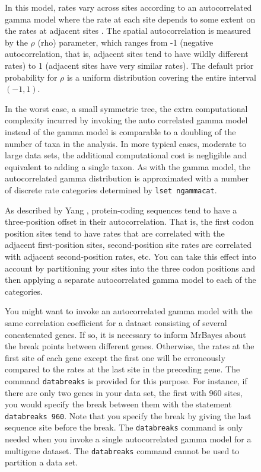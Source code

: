 \documentclass[12pt]{book}
\newcommand{\ttt}[1]{\texttt{#1}}
\begin{document}
\begin{figure}[h]
In this model, rates vary across sites according to an autocorrelated gamma model where the rate at
each site depends to some extent on the rates at adjacent sites \citep{yang95a}. The spatial
autocorrelation is measured by the $\rho$ (rho) parameter, which ranges from -1 (negative
autocorrelation, that is, adjacent sites tend to have wildly different rates) to 1 (adjacent sites
have very similar rates). The default prior probability for $\rho$ is a uniform distribution
covering the entire interval $(-1,1)$.

In the worst case, a small symmetric tree, the extra computational complexity incurred by invoking
the auto correlated gamma model instead of the gamma model is comparable to a doubling of the
number of taxa in the analysis. In more typical cases, moderate to large data sets, the additional
computational cost is negligible and equivalent to adding a single taxon. As with the gamma model,
the autocorrelated gamma distribution is approximated with a number of discrete rate categories
determined by \ttt{lset ngammacat}.

As described by Yang \citep{yang95a}, protein-coding sequences tend to have a three-position offset
in their autocorrelation. That is, the first codon position sites tend to have rates that are
correlated with the adjacent first-position sites, second-position site rates are correlated with
adjacent second-position rates, etc. You can take this effect into account by partitioning your
sites into the three codon positions and then applying a separate autocorrelated gamma model to
each of the categories.

You might want to invoke an autocorrelated gamma model with the same correlation coefficient for a
dataset consisting of several concatenated genes. If so, it is necessary to inform MrBayes about
the break points between different genes. Otherwise, the rates at the first site of each gene
except the first one will be erroneously compared to the rates at the last site in the preceding
gene. The command \ttt{databreaks} is provided for this purpose. For instance, if there are only
two genes in your data set, the first with 960 sites, you would specify the break between them with
the statement \ttt{databreaks 960}. Note that you specify the break by giving the last sequence
site before the break. The \ttt{databreaks} command is only needed when you invoke a single
autocorrelated gamma model for a multigene dataset. The \ttt{databreaks} command cannot be used to
partition a data set.


\end{figure}
\end{document}
